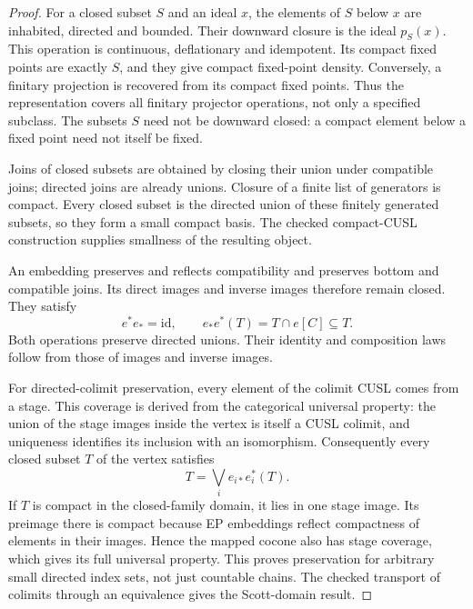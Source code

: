 \documentclass[11pt,a4paper]{article}
\theoremstyle{definition}
\theoremstyle{remark}
\newcommand{\lub}{\bigvee}
\begin{document}
\begin{proof}
For a closed subset $S$ and an ideal $x$, the elements of $S$ below $x$
are inhabited, directed and bounded. Their downward closure is the
ideal $p_S(x)$. This operation is continuous, deflationary and
idempotent. Its compact fixed points are exactly $S$, and they give
compact fixed-point density. Conversely, a finitary projection is
recovered from its compact fixed points. Thus the representation covers
all finitary projector operations, not only a specified subclass.
The subsets $S$ need not be downward closed: a compact element below a
fixed point need not itself be fixed.

Joins of closed subsets are obtained by closing their union under
compatible joins; directed joins are already unions. Closure of a
finite list of generators is compact. Every closed subset is the
directed union of these finitely generated subsets, so they form a
small compact basis. The checked compact-CUSL construction supplies
smallness of the resulting object.

An embedding preserves and reflects compatibility and preserves
bottom and compatible joins. Its direct images and inverse images
therefore remain closed. They satisfy
\[
 e^*e_*=\mathrm{id},\qquad e_*e^*(T)=T\cap e[C]\subseteq T.
\]
Both operations preserve directed unions. Their identity and
composition laws follow from those of images and inverse images.

For directed-colimit preservation, every element of the colimit CUSL
comes from a stage. This coverage is derived from the categorical
universal property: the union of the stage images inside the vertex
is itself a CUSL colimit, and uniqueness identifies its inclusion
with an isomorphism. Consequently every closed subset $T$ of the
vertex satisfies
\[
 T=\lub_i e_{i*}e_i^*(T).
\]
If $T$ is compact in the closed-family domain, it lies in one stage
image. Its preimage there is compact because EP embeddings reflect
compactness of elements in their images. Hence the mapped cocone also
has stage coverage, which gives its full universal property.
This proves preservation for arbitrary small directed index sets,
not just countable chains. The checked transport of colimits through
an equivalence gives the Scott-domain result.
\end{proof}
\end{document}
